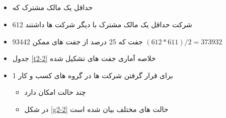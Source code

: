 \documentclass[12pt, a4paper]{article}
\begin{document}
\subsection{ }
\begin{itemize}
	\item 
	حداقل یک مالک مشترک که 
		\item 
		612 شرکت حداقل یک مالک مشترک با دیگر شرکت ها داشتند
	\item 
	93442 جفت که 25 درصد از جفت های ممکن
	$ (612*611)/2 = 373932$

	\item 
	جدول
	 \ref{t2-2}
	 خلاصه آماری جفت های تشکیل شده
	\item 1
	برای قرار گرفتن شرکت ها در گروه های کسب و کار 
	\begin{itemize}
		\item
		 چند حالت امکان دارد 
		 \item
		 در شکل 
		 \ref{g2-2}
		 حالت های مختلف بیان شده است
	\end{itemize}
	
\end{itemize}

 
\begin{LTR}
\end{LTR}
\end{document}
